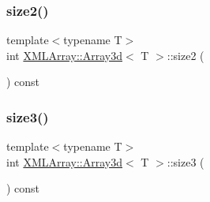 \subsubsection{\texorpdfstring{size2()}{size2()}\hspace{0.1cm}{\footnotesize\ttfamily [2/2]}}
{\footnotesize\ttfamily template$<$typename T$>$ \\
int \mbox{\hyperlink{classXMLArray_1_1Array3d}{X\+M\+L\+Array\+::\+Array3d}}$<$ T $>$\+::size2 (\begin{DoxyParamCaption}{ }\end{DoxyParamCaption}) const\hspace{0.3cm}{\ttfamily [inline]}}

\mbox{\label{classXMLArray_1_1Array3d_acd75aac75b08156dddab9c76dd3ebf33}} 
\subsubsection{\texorpdfstring{size3()}{size3()}\hspace{0.1cm}{\footnotesize\ttfamily [1/2]}}
{\footnotesize\ttfamily template$<$typename T$>$ \\
int \mbox{\hyperlink{classXMLArray_1_1Array3d}{X\+M\+L\+Array\+::\+Array3d}}$<$ T $>$\+::size3 (\begin{DoxyParamCaption}{ }\end{DoxyParamCaption}) const\hspace{0.3cm}{\ttfamily [inline]}}

